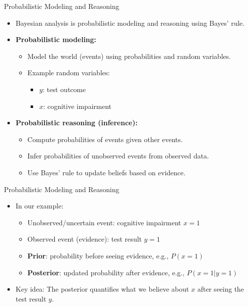 \documentclass{beamer}
\begin{document}
\begin{frame}{Probabilistic Modeling and Reasoning}
  \begin{itemize}
  \item Bayesian analysis is probabilistic modeling and reasoning using Bayes' rule.
  \item \textbf{Probabilistic modeling:}
    \begin{itemize}
      \item Model the world (events) using probabilities and random variables.
      \item Example random variables:
        \begin{itemize}
          \item $y$: test outcome
          \item $x$: cognitive impairment
        \end{itemize}
    \end{itemize}
  \item \textbf{Probabilistic reasoning (inference):}
    \begin{itemize}
      \item Compute probabilities of events given other events.
      \item Infer probabilities of unobserved events from observed data.
      \item Use \alert{Bayes' rule} to update beliefs based on evidence.
    \end{itemize}
\end{itemize}
\end{frame}

\begin{frame}{Probabilistic Modeling and Reasoning}
\begin{itemize}
  \item In our example:
    \begin{itemize}
      \item Unobserved/uncertain event: cognitive impairment $x = 1$
      \item Observed event (evidence): test result $y = 1$
      \item \textbf{Prior}: probability before seeing evidence, e.g., $P(x = 1)$
      \item \textbf{Posterior}: updated probability after evidence, e.g., $P(x = 1 | y = 1)$
    \end{itemize}
  \item \alert{Key idea:} The posterior quantifies what we believe about $x$ after seeing the test result $y$.
\end{itemize}
\end{frame}
\end{document}

